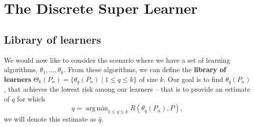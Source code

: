 \documentclass[11pt, a4paper]{article}
\DeclareMathOperator*{\argmin}{arg\,min}
\theoremstyle{definition}
\theoremstyle{remark}
\newcommand{\q}{q}
\newcommand{\ml}{k}
\newcommand{\btheta}{\theta}
\newcommand{\lib}{\Theta}
\DeclareMathOperator{\expit}{expit}
\begin{document}


\section{The Discrete Super Learner}
\subsection{Library of learners}
We would now like to consider the scenario where we have a set of learning algorithms, $ \btheta_1 , \ldots, \btheta_\ml $. From these algorithms, we can define the \textbf{library of learners} $ \lib_{k}(P_n) = \{\btheta_{\q}(P_n) \mid 1 \leq \q \leq \ml \} $ of size $ \ml $. Our goal is to find $ \btheta_{\q}(P_n) $, that achieves the lowest risk among our learners -- that is to provide an estimate of $ \q $ for which $$ \q = \argmin_{1 \leq \q \leq \ml} R(\theta_{\q}(P_n) , P), $$ we will denote this estimate as $ \hat{q} $.
\end{document}
